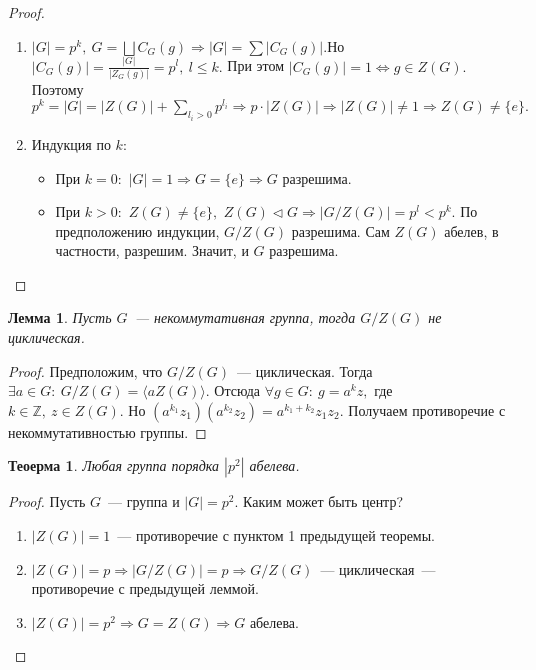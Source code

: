 \documentclass[a4paper, 14pt]{extarticle}
\newcommand{\integers}{\mathbb{Z}}
\theoremstyle{definition}
\theoremstyle{plain}
\newtheorem{theorem}{Теоерма}
\numberwithin{theorem}{section}
\numberwithin{definition}{section}
\numberwithin{statement}{section}
\newtheorem{lemma}{Лемма}
\numberwithin{lemma}{section}
\numberwithin{consequence}{section}
\begin{document}
        \begin{proof}
            \
            \begin{enumerate}
            \setlength\itemsep{0.1em}
                \item ${|G| = p^k, \ G = \bigsqcup C_G(g) \Rightarrow |G| = \displaystyle\sum|C_G(g)|.}$\newline Но ${|C_G(g)| = \frac{|G|}{|Z_G(g)|} = p^l, \ l \leqslant k.}$ При этом ${|C_G(g)| = 1 \Leftrightarrow g \in Z(G).}$ Поэтому ${p^k = |G| = |Z(G)| + \displaystyle\sum_{l_i > 0} p^{l_i} \Rightarrow p \cdot |Z(G)| \Rightarrow |Z(G)| \neq 1 \Rightarrow Z(G) \neq \{e\}.}$
                \item Индукция по $k$:
                \begin{itemize}
                \setlength\itemsep{0.1em}
                    \item При ${k = 0{:}}$ ${|G| = 1 \Rightarrow G = \{e\} \Rightarrow G}$ разрешима.
                    \item При ${k > 0{:}}$ ${Z(G) \neq \{e\},}$ ${Z(G) \lhd G \Rightarrow |G/Z(G)| = p^l < p^k.}$ По предположению
                    индукции, ${G/Z(G)}$ разрешима. Сам ${Z(G)}$ абелев, в частности, разрешим. Значит, и $G$ разрешима. \qedhere
                \end{itemize}
            \end{enumerate}
        \end{proof}
        \begin{lemma}
            Пусть $G$~--- некоммутативная группа, тогда ${G/Z(G)}$ не циклическая.
        \end{lemma}
        \begin{proof}
            Предположим, что ${G/Z(G)}$~--- циклическая. Тогда ${\exists a \in G{:} \ G/Z(G) = \langle aZ(G) \rangle.}$ Отсюда ${\forall g \in G{:} \ g = a^kz,}$ где ${k \in \integers, \ z \in Z(G).}$ Но ${(a^{k_1}z_1)(a^{k_2}z_2) = a^{k_1+k_2}z_1z_2.}$ Получаем противоречие с некоммутативностью группы.
        \end{proof}
        \newpage
        \begin{theorem}
            Любая группа порядка $|p^2|$ абелева.
        \end{theorem}
        \begin{proof}
            Пусть $G$~--- группа и ${|G| = p^2.}$ Каким может быть центр?
            \begin{enumerate}
            \setlength\itemsep{0.1em}
                \item ${|Z(G)| = 1}$~--- противоречие с пунктом 1 предыдущей теоремы.
                \item ${|Z(G)| = p \Rightarrow |G/Z(G)| = p \Rightarrow G/Z(G)}$~--- циклическая~--- противоречие с предыдущей леммой.
                \item ${|Z(G)| = p^2 \Rightarrow G = Z(G) \Rightarrow G}$ абелева. \qedhere
            \end{enumerate}
        \end{proof}
\end{document}
